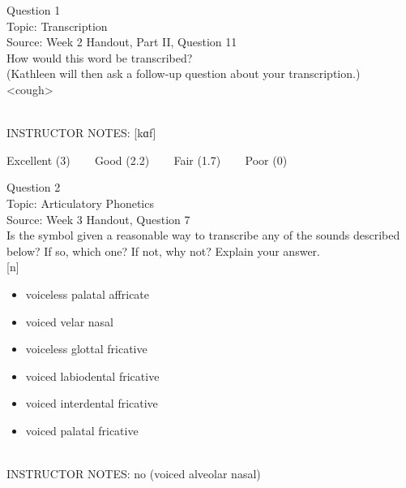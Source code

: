 \documentclass[12pt]{article}
\begin{document}
\begin{center}
\textbf{{\color{blue}{\HUGE START OF EXAM\\}}}

\textbf{{\color{blue}{\HUGE Student ID: 12377\\}}}

\textbf{{\color{blue}{\HUGE \\}}}

\end{center}
\newpage

{\large Question 1}\\

Topic: Transcription\\
Source: Week 2 Handout, Part II, Question 11\\

How would this word be transcribed?\\ (Kathleen will then ask a follow-up question about your transcription.)\\

<cough>


~\\
INSTRUCTOR NOTES: [kɑf]


\vfill
Excellent (3) ~~~ Good (2.2) ~~~ Fair (1.7) ~~~ Poor (0)
\newpage

{\large Question 2}\\

Topic: Articulatory Phonetics\\
Source: Week 3 Handout, Question 7\\

Is the symbol given a reasonable way to transcribe any of the sounds described below? If so, which one? If not, why not? Explain your answer.\\

{[n]}

\begin{itemize} \item voiceless palatal affricate \item voiced velar nasal \item voiceless glottal fricative \item voiced labiodental fricative \item voiced interdental fricative \item voiced palatal fricative \end{itemize}


~\\
INSTRUCTOR NOTES: no (voiced alveolar nasal)
\end{document}
